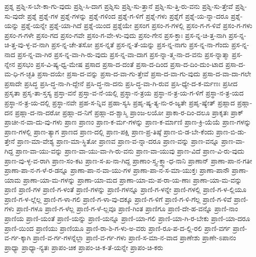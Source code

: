 {ಪ್ರಶ್ನ
ಪ್ರಶ್ನಿ-ಸ-ಬೇ-ಕಾ-ಗು-ವುದು
ಪ್ರಶ್ನಿ-ಸಿ-ದಾಗ
ಪ್ರಶ್ನಿಸು
ಪ್ರಶ್ನಿ-ಸು-ತ್ತಾನೆ
ಪ್ರಶ್ನಿ-ಸು-ತ್ತಿ-ರು-ವನು
ಪ್ರಶ್ನಿ-ಸು-ತ್ತೇವೆ
ಪ್ರಶ್ನಿ-ಸು-ವುದೇ
ಪ್ರಶ್ನೆ
ಪ್ರಶ್ನೆ-ಗಳ
ಪ್ರಶ್ನೆ-ಗಳನ್ನು
ಪ್ರಶ್ನೆ-ಗಳಿಂದ
ಪ್ರಶ್ನೆ-ಗ-ಳಿಗೆ
ಪ್ರಶ್ನೆ-ಗಳು
ಪ್ರಶ್ನೆಗೆ
ಪ್ರಶ್ನೆ-ಯ-ನ್ನಾ-ದರೂ
ಪ್ರಶ್ನೆ-ಯನ್ನು
ಪ್ರಶ್ನೆ-ಯನ್ನೇ
ಪ್ರಶ್ನೆ-ಯಾ-ಗಿದೆ
ಪ್ರಶ್ನೆ-ಯಿಂದ
ಪ್ರಶ್ನೆಯೇ
ಪ್ರಸಂಗ
ಪ್ರಸಂ-ಗ-ಗಳಲ್ಲಿ
ಪ್ರಸಂ-ಗ-ಗ-ಳಿವೆ
ಪ್ರಸಂ-ಗ-ಗಳು
ಪ್ರಸಂ-ಗ-ಗಳೇ
ಪ್ರಸಂ-ಗದ
ಪ್ರಸಂ-ಗವೇ
ಪ್ರಸಂ-ಗ-ವೇ-ಳು-ವುದು
ಪ್ರಸಂ-ಗೇನ
ಪ್ರಸ-ಕ್ತಾಃ
ಪ್ರಸ-ನ್ನ-ಚಿ-ತ್ತ-ನಾಗಿ
ಪ್ರಸ-ನ್ನ-ಚಿ-ತ್ತ-ವು-ಳ್ಳ-ವ-ನಾಗಿ
ಪ್ರಸ-ನ್ನ-ಚೇ-ತಸೋ
ಪ್ರಸ-ನ್ನತೆ
ಪ್ರಸ-ನ್ನ-ತೆ-ಯನ್ನು
ಪ್ರಸ-ನ್ನ-ನಾಗು
ಪ್ರಸ-ನ್ನ-ನಾ-ಗೆಂದು
ಪ್ರಸ-ನ್ನ-ನಾದ
ಪ್ರಸ-ನ್ನ-ವಾ-ಗಿರ
ಪ್ರಸ-ನ್ನ-ವಾ-ಗಿ-ರು-ವುದು
ಪ್ರಸ-ನ್ನ-ವಾ-ದಾಗ
ಪ್ರಸ-ನ್ನಾ-ತ್ಮ-ನಾ-ದ-ವನು
ಪ್ರಸ-ನ್ನಾತ್ಮಾ
ಪ್ರಸ-ನ್ನೇನ
ಪ್ರಸಭಂ
ಪ್ರಸ-ವಿ-ಷ್ಯ-ಧ್ವ-ಮೇಷ
ಪ್ರಸಾದ
ಪ್ರಸಾ-ದ-ದಂತೆ
ಪ್ರಸಾ-ದ-ದಿಂದ
ಪ್ರಸಾ-ದ-ದಿಂ-ದುಂ-ಟಾದ
ಪ್ರಸಾ-ದ-ಮ-ಧಿ-ಗ-ಚ್ಛತಿ
ಪ್ರಸಾ-ದಯೇ
ಪ್ರಸಾ-ದ-ವನ್ನು
ಪ್ರಸಾ-ದ-ವಾ-ಗು-ತ್ತೇವೆ
ಪ್ರಸಾ-ದ-ವಾ-ಗು-ವುದು
ಪ್ರಸಾ-ದ-ವಾ-ದಾ-ಗಲೇ
ಪ್ರಸಾದೇ
ಪ್ರಸಿದ್ಧ
ಪ್ರಸಿ-ದ್ಧ-ನಾ-ಗಿ-ದ್ದೇನೆ
ಪ್ರಸಿ-ದ್ಧ-ನಾ-ದನು
ಪ್ರಸಿ-ದ್ಧ-ವಾ-ಗಿ-ರುವ
ಪ್ರಸಿ-ಧ್ಯೇ-ದ-ಕ-ರ್ಮಣಃ
ಪ್ರಸೀದ
ಪ್ರಸೃತಾ
ಪ್ರಸೃ-ತಾ-ಸ್ತಸ್ಯ
ಪ್ರಸ್ತಾ-ವನೆ
ಪ್ರಸ್ತಾ-ವ-ನೆ-ಯಲ್ಲಿ
ಪ್ರಸ್ಥಾ-ನ-ತ್ರಯ
ಪ್ರಸ್ಥಾ-ನ-ತ್ರ-ಯ-ಗ-ಳಿಗೆ
ಪ್ರಸ್ಥಾ-ನ-ತ್ರ-ಯದ
ಪ್ರಸ್ಥಾ-ನ-ತ್ರ-ಯ-ದಲ್ಲಿ
ಪ್ರಸ್ಥಾ-ನವೇ
ಪ್ರಹ-ಸ-ನ್ನಿವ
ಪ್ರಹಾ-ಸ್ಯಸಿ
ಪ್ರಹೃ-ಷ್ಯ-ತ್ಯ-ನು-ರ-ಜ್ಯತೇ
ಪ್ರಹೃ-ಷ್ಯೇತ್
ಪ್ರಹ್ಲಾದ
ಪ್ರಹ್ಲಾ-ದನ
ಪ್ರಹ್ಲಾ-ದ-ನಾ-ದರೋ
ಪ್ರಹ್ಲಾ-ದ-ನಿಗೆ
ಪ್ರಹ್ಲಾ-ದ-ಶ್ಚಾಸ್ಮಿ
ಪ್ರಾಂಜ-ಲಯೋ
ಪ್ರಾಕಾ-ರ-ದಿಂ-ದಲೂ
ಪ್ರಾಕೃತಃ
ಪ್ರಾಕ್
ಪ್ರಾಚೀ-ನ-ವಾ-ದು-ವು-ಗಳು
ಪ್ರಾಣ
ಪ್ರಾಣಂ
ಪ್ರಾಣ-ಕ-ರ್ಮ-ಗಳನ್ನು
ಪ್ರಾಣ-ಕ-ರ್ಮಾಣಿ
ಪ್ರಾಣ-ಕ್ರಿ-ಯೆಯೆ
ಪ್ರಾಣ-ಗಳನ್ನು
ಪ್ರಾಣ-ಗಳಲ್ಲಿ
ಪ್ರಾಣ-ತ್ಯಾಗ
ಪ್ರಾಣದ
ಪ್ರಾಣ-ದಲ್ಲಿ
ಪ್ರಾಣ-ಪಕ್ಷಿ
ಪ್ರಾಣ-ಪ್ರ-ತಿಷ್ಠೆ
ಪ್ರಾಣ-ಬಿ-ಡ-ಬೇ-ಕೆಂದು
ಪ್ರಾಣ-ಬಿ-ಡು-ತ್ತೇನೆ
ಪ್ರಾಣ-ಮಾ-ವೇಶ್ಯ
ಪ್ರಾಣ-ಮಾ-ಸ್ಥಿತೋ
ಪ್ರಾಣವ
ಪ್ರಾಣ-ವ-ನ್ನಾ-ದರೂ
ಪ್ರಾಣ-ವನ್ನು
ಪ್ರಾಣ-ವನ್ನೂ
ಪ್ರಾಣ-ವಾ-ಗಿದ್ದ
ಪ್ರಾಣ-ವಾ-ಯು-ವನ್ನು
ಪ್ರಾಣ-ವಾ-ಯು-ವಾ-ಗಿ-ರು-ವನು
ಪ್ರಾಣ-ವಾ-ಯುವು
ಪ್ರಾಣ-ವಿದೆ
ಪ್ರಾಣ-ವಿ-ರು-ವುದು
ಪ್ರಾಣ-ವು-ಳ್ಳ-ವ-ರಾಗಿ
ಪ್ರಾಣ-ಸಂ-ಕಟ
ಪ್ರಾಣ-ಸ-ಖ-ನಾ-ಗಿದ್ದ
ಪ್ರಾಣಾಂ-ಸ್ತ್ಯ-ಕ್ತ್ವಾ-ಧ-ನಾನಿ
ಪ್ರಾಣಾನ್
ಪ್ರಾಣಾ-ಪಾ-ನ-ಗತೀ
ಪ್ರಾಣಾ-ಪಾ-ನ-ಗ-ಳೆ-ರ-ಡನ್ನೂ
ಪ್ರಾಣಾ-ಪಾ-ನ-ವಾ-ಯು-ಗಳ
ಪ್ರಾಣಾ-ಪಾ-ನ-ಸ-ಮಾ-ಯುಕ್ತಃ
ಪ್ರಾಣಾ-ಪಾನೌ
ಪ್ರಾಣಾ-ಯಾಮ
ಪ್ರಾಣಾ-ಯಾ-ಮ-ಗಳನ್ನು
ಪ್ರಾಣಾ-ಯಾ-ಮದ
ಪ್ರಾಣಾ-ಯಾ-ಮ-ಪ-ರಾ-ಯ-ಣಾಃ
ಪ್ರಾಣಾ-ಯಾ-ಮ-ವನ್ನು
ಪ್ರಾಣಿ
ಪ್ರಾಣಿ-ಗಳ
ಪ್ರಾಣಿ-ಗ-ಳಂತೆ
ಪ್ರಾಣಿ-ಗಳನ್ನು
ಪ್ರಾಣಿ-ಗಳನ್ನೂ
ಪ್ರಾಣಿ-ಗ-ಳನ್ನೇ
ಪ್ರಾಣಿ-ಗಳಲ್ಲಿ
ಪ್ರಾಣಿ-ಗ-ಳ-ಲ್ಲಿಯೂ
ಪ್ರಾಣಿ-ಗ-ಳ-ಲ್ಲೆಲ್ಲ
ಪ್ರಾಣಿ-ಗ-ಳಾ-ಗಲಿ
ಪ್ರಾಣಿ-ಗ-ಳಾ-ವು-ದಕ್ಕೂ
ಪ್ರಾಣಿ-ಗ-ಳಿಗೆ
ಪ್ರಾಣಿ-ಗ-ಳಿ-ಗೆಲ್ಲ
ಪ್ರಾಣಿ-ಗ-ಳಿವೆ
ಪ್ರಾಣಿ-ಗಳು
ಪ್ರಾಣಿ-ಗಳೂ
ಪ್ರಾಣಿ-ಗ-ಳೆಲ್ಲ
ಪ್ರಾಣಿ-ಗ-ಳೆ-ಲ್ಲವೂ
ಪ್ರಾಣಿ-ಗಿಂತ
ಪ್ರಾಣಿಗೂ
ಪ್ರಾಣಿ-ದೇ-ಹ-ವನ್ನೊ
ಪ್ರಾಣಿ-ನಾಂ
ಪ್ರಾಣಿಯ
ಪ್ರಾಣಿ-ಯಂತೆ
ಪ್ರಾಣಿ-ಯನ್ನು
ಪ್ರಾಣಿ-ಯನ್ನೂ
ಪ್ರಾಣಿ-ಯಾ-ಗಲಿ
ಪ್ರಾಣಿ-ಯಾ-ಗಿ-ರ-ಬೇಕು
ಪ್ರಾಣಿ-ಯಾ-ದರೂ
ಪ್ರಾಣಿ-ಯಿಂದ
ಪ್ರಾಣಿಯು
ಪ್ರಾಣಿಯೂ
ಪ್ರಾಣಿ-ರಾ-ಶಿ-ಗ-ಳು-ಅ-ವರು
ಪ್ರಾಣಿ-ರೂ-ಪ-ದ-ಲ್ಲಿ-ರಲಿ
ಪ್ರಾಣಿ-ವರ್ಗ
ಪ್ರಾಣಿ-ವ-ರ್ಗ-ಕ್ಕಾಗಿ
ಪ್ರಾಣಿ-ವ-ರ್ಗ-ಗಳನ್ನೆಲ್ಲಾ
ಪ್ರಾಣಿ-ವ-ರ್ಗ-ಗಳು
ಪ್ರಾಣಿ-ಸ-ಮಾ-ನ-ವಾದ
ಪ್ರಾಣೇಶು
ಪ್ರಾಣೇ-ಽಪಾನಂ
ಪ್ರಾಧ್ಯಾ
ಪ್ರಾಧ್ಯಾ-ನ್ಯತಃ
ಪ್ರಾಪಂ-ಚಿಕ
ಪ್ರಾಪಂ-ಚಿ-ಕ-ತೆ-ಯನ್ನೇ
ಪ್ರಾಪಂ-ಚಿ-ಕರು
}
